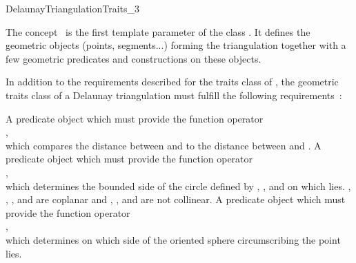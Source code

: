 

\begin{ccRefConcept}{DelaunayTriangulationTraits_3}

\ccDefinition
The concept \ccRefName\ is the first template parameter of the class
. It defines the geometric objects (points,
segments...) forming the triangulation together with a few geometric
predicates and constructions on these objects.

\ccRefines {}

In addition to the requirements described for the traits class of
, the geometric traits class of a
Delaunay triangulation must fulfill the following requirements~:

\ccTypes
{}

\ccGlue
{}
\ccGlue
{}
\ccGlue
{}


{A predicate object which must provide the function operator\\
,\\
which compares the distance between  and  to the distance
between  and .}
\ccGlue
{}
{A predicate object which must provide the function operator\\
,\\
which determines the bounded side of the circle defined
by , , and  on which  lies.
\ccPrecond {}, , , and  are coplanar and
, , and  are not collinear.}
\ccGlue
{}
{A predicate object which must provide the function operator\\
,\\
which determines on which side of the oriented sphere circumscribing 
 the point  lies.}


\end{ccRefConcept}
